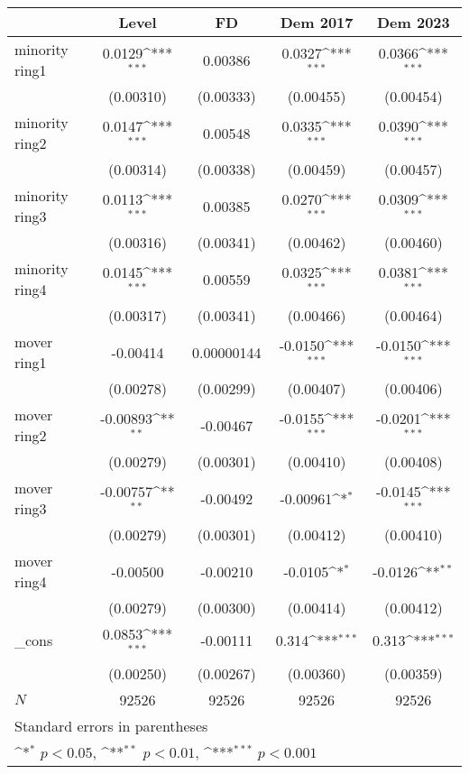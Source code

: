 {
\def\sym#1{\ifmmode^{#1}\else\(^{#1}\)\fi}
\begin{tabular}{l*{4}{c}}
\hline\hline
            &\multicolumn{1}{c}{Level}&\multicolumn{1}{c}{FD}&\multicolumn{1}{c}{Dem 2017}&\multicolumn{1}{c}{Dem 2023}\\
\hline
minority ring1&      0.0129\sym{***}&     0.00386         &      0.0327\sym{***}&      0.0366\sym{***}\\
            &   (0.00310)         &   (0.00333)         &   (0.00455)         &   (0.00454)         \\
[1em]
minority ring2&      0.0147\sym{***}&     0.00548         &      0.0335\sym{***}&      0.0390\sym{***}\\
            &   (0.00314)         &   (0.00338)         &   (0.00459)         &   (0.00457)         \\
[1em]
minority ring3&      0.0113\sym{***}&     0.00385         &      0.0270\sym{***}&      0.0309\sym{***}\\
            &   (0.00316)         &   (0.00341)         &   (0.00462)         &   (0.00460)         \\
[1em]
minority ring4&      0.0145\sym{***}&     0.00559         &      0.0325\sym{***}&      0.0381\sym{***}\\
            &   (0.00317)         &   (0.00341)         &   (0.00466)         &   (0.00464)         \\
[1em]
mover ring1 &    -0.00414         &  0.00000144         &     -0.0150\sym{***}&     -0.0150\sym{***}\\
            &   (0.00278)         &   (0.00299)         &   (0.00407)         &   (0.00406)         \\
[1em]
mover ring2 &    -0.00893\sym{**} &    -0.00467         &     -0.0155\sym{***}&     -0.0201\sym{***}\\
            &   (0.00279)         &   (0.00301)         &   (0.00410)         &   (0.00408)         \\
[1em]
mover ring3 &    -0.00757\sym{**} &    -0.00492         &    -0.00961\sym{*}  &     -0.0145\sym{***}\\
            &   (0.00279)         &   (0.00301)         &   (0.00412)         &   (0.00410)         \\
[1em]
mover ring4 &    -0.00500         &    -0.00210         &     -0.0105\sym{*}  &     -0.0126\sym{**} \\
            &   (0.00279)         &   (0.00300)         &   (0.00414)         &   (0.00412)         \\
[1em]
\_cons      &      0.0853\sym{***}&    -0.00111         &       0.314\sym{***}&       0.313\sym{***}\\
            &   (0.00250)         &   (0.00267)         &   (0.00360)         &   (0.00359)         \\
\hline
\(N\)       &       92526         &       92526         &       92526         &       92526         \\
\hline\hline
\multicolumn{5}{l}{\footnotesize Standard errors in parentheses}\\
\multicolumn{5}{l}{\footnotesize \sym{*} \(p<0.05\), \sym{**} \(p<0.01\), \sym{***} \(p<0.001\)}\\
\end{tabular}
}
